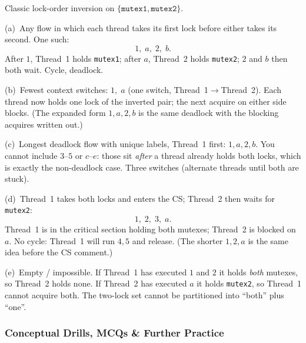 \documentclass[11pt,a4paper]{article}
\newenvironment{Sol}{%
  \begin{tcolorbox}[sboxstyle, title={Solution}]%
}{%
  \end{tcolorbox}\vspace{0.35em}%
}
\begin{document}
\begin{Sol}
Classic lock-order inversion on $\{\texttt{mutex1},\texttt{mutex2}\}$.

(a)~Any flow in which each thread takes its first lock before either takes
its second. One such:
\[
1,\; a,\; 2,\; b.
\]
After $1$, Thread~1 holds \texttt{mutex1}; after $a$, Thread~2 holds
\texttt{mutex2}; $2$ and $b$ then both wait. Cycle, deadlock.

(b)~Fewest context switches: $1,\; a$ (one switch, Thread~1$\to$Thread~2).
Each thread now holds one lock of the inverted pair; the next acquire on
either side blocks. (The expanded form $1,a,2,b$ is the same deadlock
with the blocking acquires written out.)

(c)~Longest deadlock flow with unique labels, Thread~1 first: $1, a, 2, b$.
You cannot include $3$--$5$ or $c$--$e$: those sit \emph{after} a thread
already holds both locks, which is exactly the non-deadlock case. Three
switches (alternate threads until both are stuck).

(d)~Thread~1 takes both locks and enters the CS; Thread~2 then waits for
\texttt{mutex2}:
\[
1,\; 2,\; 3,\; a.
\]
Thread~1 is in the critical section holding both mutexes; Thread~2 is
blocked on $a$. No cycle: Thread~1 will run $4,5$ and release. (The
shorter $1,2,a$ is the same idea before the CS comment.)

(e)~Empty / impossible. If Thread~1 has executed $1$ and $2$ it holds
\emph{both} mutexes, so Thread~2 holds none. If Thread~2 has executed $a$
it holds \texttt{mutex2}, so Thread~1 cannot acquire both. The two-lock
set cannot be partitioned into ``both'' plus ``one''.
\end{Sol}

\subsubsection*{Conceptual Drills, MCQs \& Further Practice}
\end{document}
